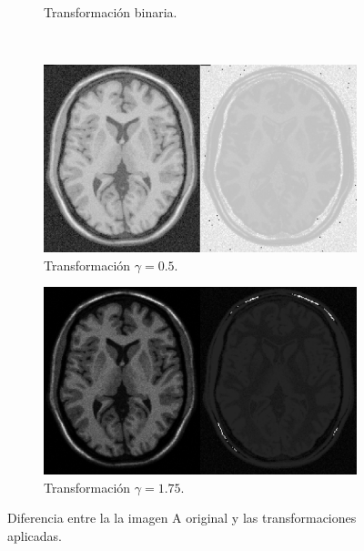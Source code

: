 \documentclass[letterpaper,12pt]{article}
\theoremstyle{plain}
\begin{document}
\begin{figure}[H]
\begin{subfigure}[h]{0.3\textwidth}
            \caption{Transformación binaria.} 
            \label{fig:binary_sustraction}
        \end{subfigure}
         \\
        \begin{subfigure}[h]{0.3\textwidth}
            \centering
            \includegraphics[width=\textwidth]{Figuras/dif_gamma=0.5.png}
            \caption{Transformación $\gamma = 0.5$.}
            \label{fig:Exptrans0.5_sustraction}
        \end{subfigure}
        \begin{subfigure}[h]{0.3\textwidth}
            \centering
            \includegraphics[width=\textwidth]{Figuras/dif_gamma=1.75.png}
            \caption{Transformación $\gamma = 1.75$.}
            \label{fig:Exptrans1.75_sustraction}
        \end{subfigure}
        \caption{Diferencia entre la la imagen A original y las transformaciones aplicadas.}
\end{figure}
\end{document}
